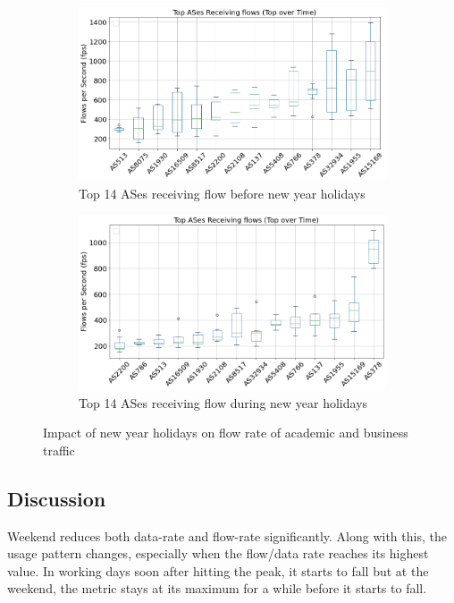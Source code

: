 \documentclass[10pt, journal, letterpaper]{IEEEtran}
\newcommand\figSzeMahdi{0.8}
\begin{document}
\begin{figure}[hbt!]
    \centering
    \begin{subfigure}{\figSzeMahdi\columnwidth}
          \centering
          \includegraphics[width=\columnwidth]{img/BCH2_top14AS_recieving_fps.png}
          \caption{Top 14 ASes receiving flow before new year holidays}
          \label{fig:BCH2_topAS_rec_fps}
    \end{subfigure}
    \begin{subfigure}{\figSzeMahdi\columnwidth}
          \centering
          \includegraphics[width=\columnwidth]{img/CH2_top14AS_recieving_fps.png}
          \caption{Top 14 ASes receiving flow during new year holidays}
          \label{fig:CH2_topAS_rec_fps}
    \end{subfigure}
    \caption{Impact of new year holidays on flow rate of academic and business traffic}
    \label{fig:flowrate_topAS_rec_BCH_CH}
\end{figure}

\subsection{Discussion}
Weekend reduces both data-rate and flow-rate significantly. Along with this, the usage pattern changes, especially when the flow/data rate reaches its highest value. In working days soon after hitting the peak, it starts to fall but at the weekend, the metric stays at its maximum for a while before it starts to fall.
\end{document}
